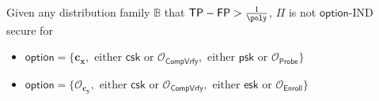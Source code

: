 \begin{theorem}
\label{thm:ind-tp-fp}
Given any distribution family $\mathbb{B}$ that $\textsf{TP} - \textsf{FP} > \frac{1}{\poly}$, $\Pi$ is not $\textsf{option}$-IND secure for
\begin{itemize}
	\item $\textsf{option} = \{\mathbf{c_x}, \text{ either } \textsf{csk} \text{ or } \mathcal{O}_{\textsf{CompVrfy}}, \text{ either } \textsf{psk} \text{ or } \mathcal{O}_{\textsf{Probe}} \}$

	\item $\textsf{option} = \{\mathcal{O}_{\mathbf{c_y}}, \text{ either } \textsf{csk} \text{ or } \mathcal{O}_{\textsf{CompVrfy}}, \text{ either } \textsf{esk} \text{ or } \mathcal{O}_{\textsf{Enroll}} \}$
\end{itemize}

\end{theorem}

